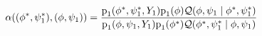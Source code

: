 \begin{equation*}
  \alpha((\phi^{*}, \psi_{1}^{*}), (\phi, \psi_{1})) = 
  \frac {
    \text{p}_{1}(\phi^{*}, \psi_{1}^{*}, Y_{1}) 
    \text{p}_{1} (\phi)
    \mathcal{Q}(\phi, \psi_{1} \mid \phi^{*}, \psi_{1}^{*})
  } {
    \text{p}_{1}(\phi, \psi_{1}, Y_{1}) 
    \text{p}_{1} (\phi^{*})
    \mathcal{Q}(\phi^{*}, \psi_{1}^{*} \mid \phi, \psi_{1})
  }
  \label{eqn:stage-one-acceptance}
\end{equation*}